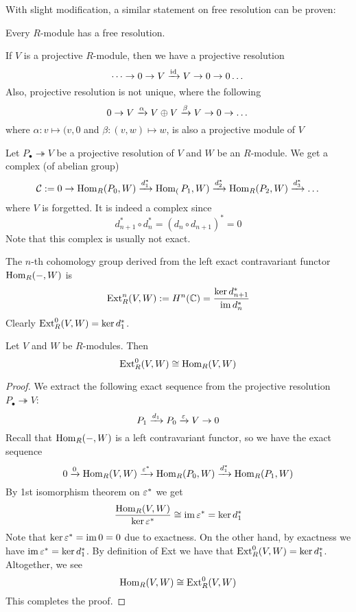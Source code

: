 With slight modification, a similar statement on free resolution can be proven:

\medskip

\begin{pro}
    Every $R$-module has a free resolution.
\end{pro}

\medskip

\begin{re}
    If $V$ is a projective $R$-module, then we have a projective resolution
    \[\dots \to 0 \to V \xrightarrow{\operatorname{id}} V \to 0 \to 0 \dots\]
    Also, projective resolution is not unique, where the following
    \[0 \to V \xrightarrow{\alpha} V\oplus V \xrightarrow{\beta} V \to 0 \to \dots\]
    where $\alpha:v\mapsto (v,0$ and $\beta:(v,w)\mapsto w$, is also a projective module of $V$
\end{re}

\medskip

\begin{defn}
    Let $P_\bullet \twoheadrightarrow V$ be a projective resolution of $V$ and $W$ be an $R$-module. We get a complex (of abelian group)
    \[\mathcal C:=0 \to \operatorname{Hom}_R(P_0, W)\xrightarrow{d_1^*} \operatorname{Hom}_(P_1, W) \xrightarrow{d_2^*} \operatorname{Hom}_R(P_2, W)\xrightarrow{d^*_3}\dots\]
    where $V$ is forgetted. It is indeed a complex since
    \[d_{n+1}^*\circ d_n^* = (d_n \circ d_{n+1})^* = 0\]
    Note that this complex is usually not exact.

    The $n$-th cohomology group derived from the left exact contravariant functor $\operatorname{Hom}_R(-, W)$ is 
    \[\operatorname{Ext}_R^n(V,W):= H^n({\mathbb C})=\frac{\ker d_{n+1}^*}{\operatorname{im} d_n^*}\]
    Clearly $\operatorname{Ext}_R^0(V,W) = \ker d_1 ^*$.
\end{defn}

\medskip

\begin{pro}
    Let $V$ and $W$ be $R$-modules. Then
    \[\operatorname{Ext}^0_R(V,W) \cong \operatorname{Hom}_R(V,W)\]
\end{pro}
\begin{proof}
    We extract the following exact sequence from the projective resolution $P_\bullet \twoheadrightarrow V$:
    \[P_1 \xrightarrow{d_1} P_0 \xrightarrow{\varepsilon} V \to 0\]
    Recall that $\operatorname{Hom}_R(-,W)$ is a left contravariant functor, so we have the exact sequence
    \[0 \xrightarrow{0} \operatorname{Hom}_R(V,W) \xrightarrow{\varepsilon^*} \operatorname{Hom}_R(P_0, W) \xrightarrow{d_1^*} \operatorname{Hom}_R(P_1,W)\]
    By 1st isomorphism theorem on $\varepsilon^*$ we get 
    \[\frac{\operatorname{Hom}_R(V,W)}{\ker \varepsilon^*}\cong \operatorname{im}\varepsilon^* = \ker d_1^*\]
    Note that $\ker \varepsilon^* = \operatorname{im} 0 = 0$ due to exactness. On the other hand, by exactness we have $\operatorname{im} \varepsilon^* = \ker d_1^*$. By definition of Ext we have that $\operatorname{Ext}^0_R(V,W) = \ker d_1^*$. Altogether, we see
    \[\operatorname{Hom}_R(V,W) \cong \operatorname{Ext}_R^0(V,W)\]
    This completes the proof.
\end{proof}